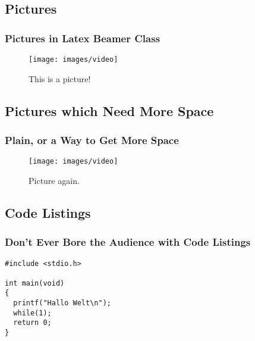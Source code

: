\documentclass{beamer}
\begin{document}
\subsection{Pictures} 
\begin{frame}
   \frametitle{Pictures in Latex Beamer Class}
   \begin{figure}
      \texttt{[image: images/video]} 
      \caption{This is a picture!}
   \end{figure}
\end{frame}



\subsection{Pictures which Need More Space} 
\begin{frame}[plain]
   \frametitle{Plain, or a Way to Get More Space}
   \begin{figure}
      \texttt{[image: images/video]} 
      \caption{Picture again.}
   \end{figure}
\end{frame}



\subsection{Code Listings} 
\begin{frame}[fragile]
   \frametitle{Don't Ever Bore the Audience with Code Listings}
   \lstset{language=C, basicstyle=\small \ttfamily, showspaces=false, showtabs=false, tab= , keywordstyle=\bfseries, showstringspaces=false, framexleftmargin=5mm, frame=single, numbers=left, numberstyle=\tiny, stepnumber=1, numbersep=5pt, texcl=true}
   \begin{lstlisting}[caption={Especially when they are erroneous},frame=tlrb]
#include <stdio.h>

int main(void)
{
  printf("Hallo Welt\n");
  while(1);
  return 0;
}
   \end{lstlisting}
\end{frame}

\end{document}
